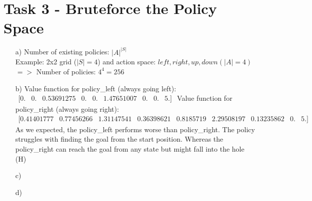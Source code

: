 \documentclass[a4paper]{article}
\begin{document}
	\section*{Task 3 - Bruteforce the Policy Space}
		\begin{itemize}
		\item[a)] Number of existing policies:	$|A|^{|S|}$\\
				Example: 2x2 grid ($|S|=4$) and action space: $left, right, up, down (|A| = 4)$\\
				$=>$ Number of policies: $4^4 =  256$
		\item[b)] Value function for policy\_left (always going left): \hspace{0.1cm}
		$\begin{matrix}
		[0. & 0. & 0.53691275 & 0. & 0. & 1.47651007 & 0. & 0. & 5.]
		\end{matrix}$
		\newline
		\newline
		Value function for policy\_right (always going right):\\
		$\begin{matrix}
		[0.41401777 & 0.77456266 & 1.31147541 & 0.36398621 & 0.8185719 & 2.29508197 & 0.13235862 & 0. & 5.]
		\end{matrix}$
		\newline
		\newline
		As we expected, the policy\_left performs worse than policy\_right. The policy struggles with finding the goal from the start position. Whereas the policy\_right can reach the goal from any state but might fall into the hole (H)
		\item[c)]
		\item[d)]
	\end{itemize}
\end{document}

